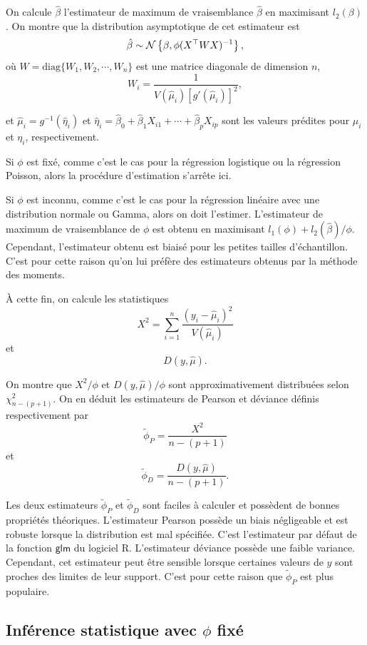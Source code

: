 \documentclass[11pt]{article}
\begin{document}
\noindent On calcule $\hat\beta$ l'estimateur de maximum de vraisemblance $\hat\beta$ en maximisant $l_2(\beta)$. On montre que la distribution asymptotique de cet estimateur est
$$\hat\beta \sim {\cal N}\left\{\beta,\phi(X^\top W X)^{-1}\right\},$$
\noindent o\`u $W=\mbox{diag}\{W_1,W_2,\cdots,W_n\}$ est une matrice diagonale de dimension $n$, $$W_i=\frac{1}{V(\hat\mu_i)\left[g'(\hat\mu_i)\right]^2},$$

\noindent et $\hat\mu_i=g^{-1}(\hat\eta_i)$ et $\hat\eta_i=\hat\beta_0+\hat\beta_1 X_{i1}+\cdots+\hat\beta_p X_{ip}$ sont les valeurs pr\'edites pour $\mu_i$ et $\eta_i$, respectivement.

\noindent Si $\phi$ est fix\'e, comme c'est le cas pour la r\'egression logistique ou la r\'egression Poisson, alors la proc\'edure d'estimation s'arr\^ete ici.


\noindent Si $\phi$ est inconnu, comme c'est le cas pour la r\'egression lin\'eaire avec une distribution normale ou Gamma, alors on doit l'estimer. L'estimateur de maximum de vraisemblance de $\phi$ est obtenu en maximisant $l_1(\phi) + l_2(\hat\beta)/\phi$. Cependant, l'estimateur obtenu est biais\'e pour les petites tailles d'\'echantillon. C'est pour cette raison qu'on lui pr\'ef\`ere des estimateurs obtenus par la m\'ethode des moments.

\noindent \`A cette fin, on calcule les statistiques 
$$X^2= \sum_{i=1}^n \frac{(y_i-\hat\mu_i)^2}{V(\hat\mu_i)}$$
et $$D(y,\hat \mu).$$

\noindent On montre que $X^2/\phi$ et $D(y,\hat\mu)/\phi$ sont approximativement distribu\'ees selon $\chi^2_{n-(p+1)}$. On en d\'eduit les estimateurs de Pearson et d\'eviance d\'efinis respectivement par $$\tilde \phi_P=\frac{X^2}{n-(p+1)}$$ et $$\tilde \phi_D=\frac{D(y,\hat\mu)}{n-(p+1)}.$$

\noindent Les deux estimateurs $\tilde \phi_P$ et $\tilde \phi_D$ sont faciles \`a calculer et poss\`edent de bonnes propri\'et\'es th\'eoriques. L'estimateur Pearson poss\`ede un biais n\'egligeable et est robuste lorsque la distribution est mal sp\'ecifi\'ee. C'est l'estimateur par d\'efaut de la fonction $\textsf{glm}$ du logiciel \textrm{R}.  L'estimateur d\'eviance poss\`ede une faible variance. Cependant, cet estimateur peut \^etre sensible lorsque certaines valeurs de $y$ sont proches des limites de leur support. C'est pour cette raison que $\tilde \phi_P$ est plus populaire.

\subsection{Inf\'erence statistique avec $\phi$ fix\'e}
\end{document}
